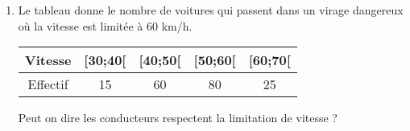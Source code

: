 \begin{enumerate}
\item Le tableau donne le nombre de voitures qui passent dans un virage dangereux où la vitesse est limitée à 60 km/h. 

\begin{tabular}{|c|c|c|c|c|}
\hline 
Vitesse & [30;40[ & [40;50[ & [50;60[ & [60;70[ \\ 
\hline 
Effectif & 15 & 60 & 80 & 25 \\ 
\hline 
\end{tabular} 

Peut on dire les conducteurs respectent la limitation de vitesse ?

\end{enumerate}